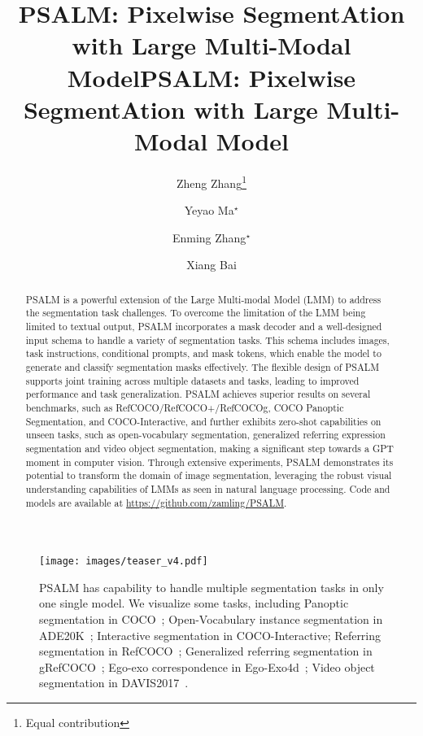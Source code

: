 \title{PSALM: Pixelwise SegmentAtion with Large Multi-Modal Model}



\title{PSALM: Pixelwise SegmentAtion with Large Multi-Modal Model} 

\author{Zheng Zhang\thanks{Equal contribution} \and Yeyao Ma$^\star$ \and Enming Zhang$^\star$ \and Xiang Bai}



\maketitle

\begin{abstract}
PSALM is a powerful extension of the Large Multi-modal Model (LMM) to address the segmentation task challenges. To overcome the limitation of the LMM being limited to textual output, PSALM incorporates a mask decoder and a well-designed input schema to handle a variety of segmentation tasks. This schema includes images, task instructions, conditional prompts, and mask tokens, which enable the model to generate and classify segmentation masks effectively. The flexible design of PSALM supports joint training across multiple datasets and tasks, leading to improved performance and task generalization. PSALM achieves superior results on several benchmarks, such as RefCOCO/RefCOCO+/RefCOCOg, COCO Panoptic Segmentation, and COCO-Interactive, and further exhibits zero-shot capabilities on unseen tasks, such as open-vocabulary segmentation, generalized referring expression segmentation and video object segmentation, making a significant step towards a GPT moment in computer vision. Through extensive experiments, PSALM demonstrates its potential to transform the domain of image segmentation, leveraging the robust visual understanding capabilities of LMMs as seen in natural language processing. Code and models are available at \url{https://github.com/zamling/PSALM}. 
\end{abstract}

\label{sec:intro}
\begin{figure}[!t]
  \centering
  \texttt{[image: images/teaser\_v4.pdf]}
  \caption{PSALM has capability to handle multiple segmentation tasks in only one single model. We visualize some tasks, including Panoptic segmentation in COCO~\cite{coco}; Open-Vocabulary instance segmentation in ADE20K~\cite{ade20k}; Interactive segmentation in COCO-Interactive; Referring segmentation in RefCOCO~\cite{refcoco}; Generalized referring segmentation in gRefCOCO~\cite{grefcoco}; Ego-exo correspondence in Ego-Exo4d~\cite{egoexo}; Video object segmentation in DAVIS2017~\cite{davis}.}
  \label{fig:teaser}
\end{figure}
